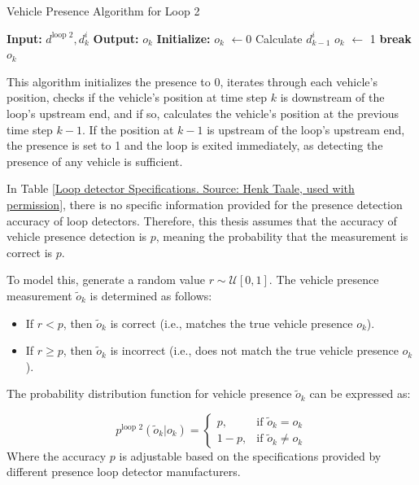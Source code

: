 \begin{algorithm}[h]
\caption{Vehicle Presence Algorithm for Loop 2}\label{Vehicle Presence Algorithm}
\begin{algorithmic}[1]
    \State \textbf{Input:} $d^{\text{loop 2}}, d_{k}^i$
    \State \textbf{Output:} $o_k$
    \State \textbf{Initialize:} $o_k$ $\gets 0$
            \State Calculate $d_{k-1}^i$
                \State $o_k$ $\gets$ 1
                \State \textbf{break} 
            \EndIf
        \EndIf
    \EndFor
    \State \Return $o_k$
\end{algorithmic}
\end{algorithm}

This algorithm initializes the presence to 0, iterates through each vehicle's position, checks if the vehicle's position at time step \(k\) is downstream of the loop's upstream end, and if so, calculates the vehicle's position at the previous time step \(k-1\). If the position at \(k-1\) is upstream of the loop's upstream end, the presence is set to 1 and the loop is exited immediately, as detecting the presence of any vehicle is sufficient.

In Table \ref{Loop detector Specifications. Source: Henk Taale, used with permission}, there is no specific information provided for the presence detection accuracy of loop detectors. Therefore, this thesis assumes that the accuracy of vehicle presence detection is \( p \), meaning the probability that the measurement is correct is \( p \).

To model this, generate a random value \( r \sim \mathcal{U}[0,1] \). The vehicle presence measurement \( \tilde o_k \) is determined as follows:
\begin{itemize}
    \item If \( r < p \), then \( \tilde o_k \) is correct (i.e., matches the true vehicle presence \( o_k \)).
    \item If \( r \geq p \), then \( \tilde o_k \) is incorrect (i.e., does not match the true vehicle presence \( o_k \)).
\end{itemize}
The probability distribution function for vehicle presence \( \tilde o_k \) can be expressed as:

\begin{equation}\label{probability distribution function loop 2}
    p^\text{loop 2}(\tilde o_k | o_k) = 
    \begin{cases} 
        p, & \text{if } \tilde o_k = o_k \\
        1 - p, & \text{if } \tilde o_k \neq o_k
    \end{cases}
\end{equation}
Where the accuracy \( p \) is adjustable based on the specifications provided by different presence loop detector manufacturers.


